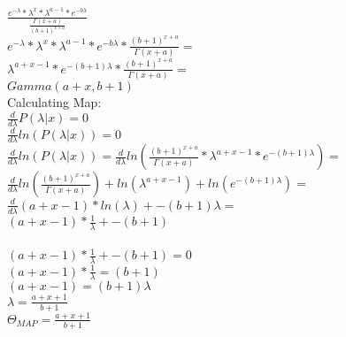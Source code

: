 $\frac{{e^{-\lambda} * \lambda^x} * \lambda^{a-1} * e^{-b\lambda} }{ \frac{\Gamma(x+a)}{(b+1)^{x+a}}} $ \\

${e^{-\lambda} * \lambda^x} * \lambda^{a-1} * e^{-b\lambda} * \frac{(b+1)^{x+a}}{\Gamma(x+a)} = $ \\ 
$\lambda^{a+x-1} * e^{-(b+1)\lambda} * \frac{(b+1)^{x+a}}{\Gamma(x+a)} = $ \\
$Gamma(a+x,b+1)$
\\
Calculating Map: \\
$\frac{d}{d\lambda} P(\lambda | x)  = 0$
\\
$\frac{d}{d\lambda} ln (P(\lambda | x))  = 0$ \\
$\frac{d}{d\lambda} ln (P(\lambda | x))   = \frac{d}{d\lambda} ln(\frac{(b+1)^{x+a}}{\Gamma(x+a)}*\lambda^{a+x-1} * e^{-(b+1)\lambda}) = $ \\
$\frac{d}{d\lambda} ln(\frac{(b+1)^{x+a}}{\Gamma(x+a)})+ ln(\lambda^{a+x-1}) + ln(e^{-(b+1)\lambda}) = $ \\
$\frac{d}{d\lambda}(a+x-1)*ln(\lambda) + {-(b+1)\lambda} = $ \\
$(a+x-1)*\frac{1}{\lambda} + -(b+1)$ \\
\\
$(a+x-1)*\frac{1}{\lambda} + -(b+1) = 0$ \\
$(a+x-1)*\frac{1}{\lambda} = (b+1)$ \\
$(a+x-1) = (b+1) \lambda$ \\
$\lambda = \frac{a+x+1}{b+1}$ \\
$\Theta_{MAP} = \frac{a+x+1}{b+1}$
